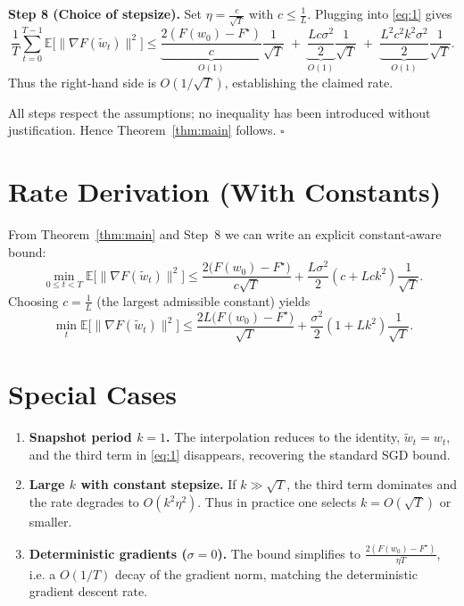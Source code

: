 \documentclass{article}
\newcommand{\EE}{\mathbb{E}}
\begin{document}
\medskip
\noindent\textbf{Step 8 (Choice of stepsize).}
Set $\eta = \frac{c}{\sqrt{T}}$ with $c\le\frac{1}{L}$.
Plugging into \eqref{eq:1} gives
\[
\frac{1}{T}\sum_{t=0}^{T-1}\EE\big[\|\nabla F(\widetilde w_t)\|^{2}\big]
\le
\underbrace{\frac{2(F(w_0)-F^{\star})}{c}}_{\displaystyle O(1)}
\frac{1}{\sqrt{T}}
\;+\;
\underbrace{\frac{L c\sigma^{2}}{2}}_{\displaystyle O(1)}\frac{1}{\sqrt{T}}
\;+\;
\underbrace{\frac{L^{2}c^{2}k^{2}\sigma^{2}}{2}}_{\displaystyle O(1)}\frac{1}{\sqrt{T}}.
\]
Thus the right‑hand side is $O(1/\sqrt{T})$, establishing the claimed rate.

All steps respect the assumptions; no inequality has been introduced without
justification.  Hence Theorem~\ref{thm:main} follows. $\square$

\section*{Rate Derivation (With Constants)}
From Theorem~\ref{thm:main} and Step~8 we can write an explicit constant‑aware bound:
\[
\min_{0\le t<T}\EE\big[\|\nabla F(\widetilde w_t)\|^{2}\big]
\le
\frac{2\big(F(w_0)-F^{\star}\big)}{c\sqrt{T}}
+\frac{L\sigma^{2}}{2}\left(c+Lck^{2}\right)\frac{1}{\sqrt{T}}.
\]
Choosing $c=\frac{1}{L}$ (the largest admissible constant) yields
\[
\min_{t}\EE\big[\|\nabla F(\widetilde w_t)\|^{2}\big]
\le
\frac{2L\big(F(w_0)-F^{\star}\big)}{\sqrt{T}}
+\frac{\sigma^{2}}{2}\left(1+Lk^{2}\right)\frac{1}{\sqrt{T}}.
\]

\section*{Special Cases}
\begin{enumerate}[noitemsep]
\item \textbf{Snapshot period $k=1$.}  The interpolation reduces to the identity,
$\widetilde w_t=w_t$, and the third term in \eqref{eq:1} disappears, recovering the
standard SGD bound.
\item \textbf{Large $k$ with constant stepsize.}  If $k\gg\sqrt{T}$, the
third term dominates and the rate degrades to $O(k^{2}\eta^{2})$.
Thus in practice one selects $k=O(\sqrt{T})$ or smaller.
\item \textbf{Deterministic gradients ($\sigma=0$).}  The bound simplifies to
$\frac{2(F(w_0)-F^{\star})}{\eta T}$, i.e. a $O(1/T)$ decay of the gradient norm,
matching the deterministic gradient descent rate.
\end{enumerate}
\end{document}
